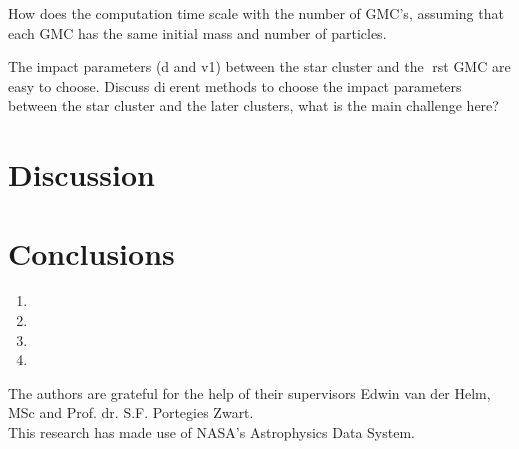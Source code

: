 \documentclass{aa}
\begin{document}
How does the computation time scale with the number of GMC's, assuming that each GMC has the
same initial mass and number of particles.

The impact parameters (d and v1) between the star cluster and the rst GMC are easy to choose.
Discuss dierent methods to choose the impact parameters between the star cluster and the later
clusters, what is the main challenge here?

\section{Discussion}\label{sec:discussion}

\section{Conclusions}\label{sec:conclusions}
\begin{enumerate}
    \item
    \item
    \item
    \item
\end{enumerate}


\begin{acknowledgements}
The authors are grateful for the help of their supervisors Edwin van der Helm, MSc and Prof. dr. S.F. Portegies Zwart. \\

This research has made use of NASA's Astrophysics Data System.
\end{acknowledgements}





\end{document}
